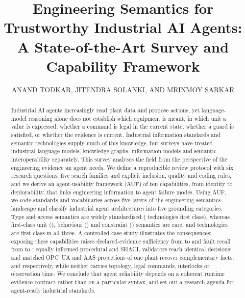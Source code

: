 \documentclass{ieeeaccess}
\begin{document}
\history{}
\doi{}

\title{Engineering Semantics for Trustworthy Industrial AI Agents: A State-of-the-Art Survey and Capability Framework}

\author{\uppercase{Anand Todkar},
\uppercase{Jitendra Solanki}, AND
\uppercase{Mrinmoy Sarkar}}
\address[1]{Siemens Foundational Technology, Siemens AG (e-mail:
anand.todkar@siemens.com; jitendra.solanki@siemens.com; mrinmoy.sarkar@siemens.com).}

\begin{abstract}
Industrial AI agents increasingly read plant data and propose actions, yet language-model
reasoning alone does not establish which equipment is meant, in which unit a value is
expressed, whether a command is legal in the current state, whether a guard is satisfied,
or whether the evidence is current. Industrial information standards and semantic
technologies supply much of this knowledge, but surveys have treated industrial language
models, knowledge graphs, information models and semantic interoperability separately.
This survey analyses the field from the perspective of the engineering evidence an agent
needs. We define a reproducible review protocol with six research questions, five search
families and explicit inclusion, quality and coding rules, and we derive an
agent-usability framework (AUF) of ten capabilities, from identity to deployability, that
links engineering information to agent failure modes. Using AUF, we code
\AufTechnologies{} standards and vocabularies across five layers of the
engineering-semantics landscape and classify industrial agent architectures into five
grounding categories. Type and access semantics are widely standardised
(\AufTypesFirstClass{} technologies first class), whereas first-class unit
(\AufUnitsFirstClass{}), behaviour (\AufBehaviourFirstClass{}) and constraint
(\AufConstraintsFirstClass{}) semantics are rare, and \AufAllThreeFirstClass{} technologies
are first class in all three. A controlled case study illustrates the consequences: exposing these
capabilities raises declared-evidence sufficiency from \CsSuffCTwo{} to \CsSuffCFour{} and
fault recall from \CsRecallGTwo{} to \CsRecallGFour{}; equally informed procedural and SHACL
validators reach identical decisions; and matched OPC~UA and AAS projections of one
plant recover complementary facts, \CsOpcuaPct{} and \CsAasPct{} respectively, while
neither carries topology, legal commands, interlocks or observation time. We conclude
that agent reliability depends on a coherent runtime evidence contract rather than on a
particular syntax, and set out a research agenda for agent-ready industrial standards.
\end{abstract}
\end{document}
